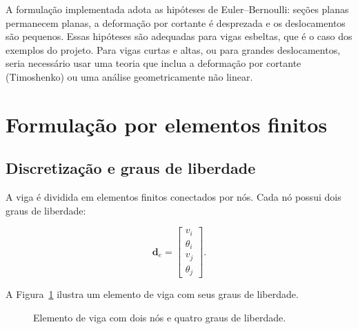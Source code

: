 \documentclass[12pt,a4paper]{article}
\begin{document}
A formulação implementada adota as hipóteses de Euler--Bernoulli: seções planas permanecem planas, a deformação por cortante é desprezada e os deslocamentos são pequenos. Essas hipóteses são adequadas para vigas esbeltas, que é o caso dos exemplos do projeto. Para vigas curtas e altas, ou para grandes deslocamentos, seria necessário usar uma teoria que inclua a deformação por cortante (Timoshenko) ou uma análise geometricamente não linear.

\section{Formulação por elementos finitos}
\label{sec:fem}

\subsection{Discretização e graus de liberdade}

A viga é dividida em elementos finitos conectados por nós. Cada nó possui dois graus de liberdade:

\begin{equation}
  \mathbf{d}_e =
  \begin{bmatrix}
    v_i \\ \theta_i \\ v_j \\ \theta_j
  \end{bmatrix}.
  \label{eq:de}
\end{equation}

A Figura~\ref{fig:elemento} ilustra um elemento de viga com seus graus de liberdade.

\begin{figure}[H]
  \centering
  \caption{Elemento de viga com dois nós e quatro graus de liberdade.}
  \label{fig:elemento}
\end{figure}
\end{document}
